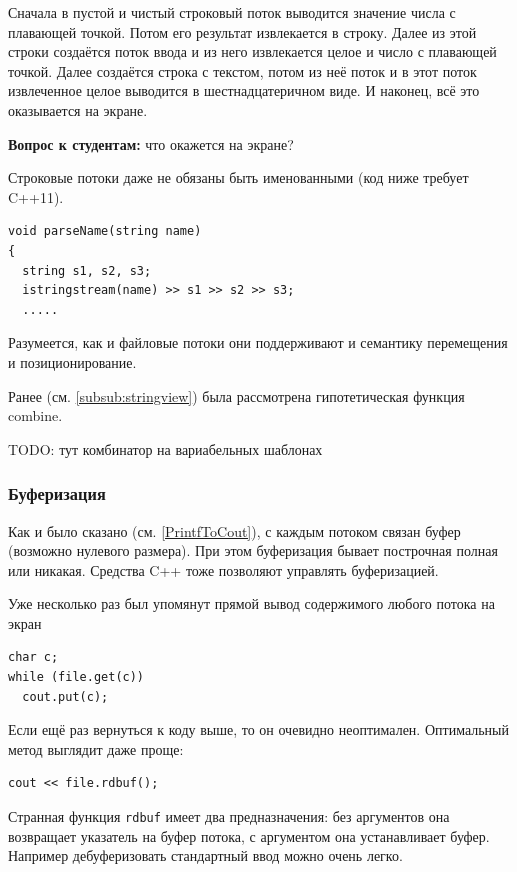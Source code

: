 \documentclass[a4paper,12pt,oneside]{article}
\newif\ifanswers
\begin{document}
Сначала в пустой и чистый строковый поток выводится значение числа с плавающей точкой. Потом его результат извлекается в строку. Далее из этой строки создаётся поток ввода и из него извлекается целое и число с плавающей точкой. Далее создаётся строка с текстом, потом из неё поток и в этот поток извлеченное целое выводится в шестнадцатеричном виде. И наконец, всё это оказывается на экране.

\textbf{Вопрос к студентам:} что окажется на экране?

\ifanswers
Правильный ответ: value: 2a 0.2442
\fi

Строковые потоки даже не обязаны быть именованными (код ниже требует C++11).

\begin{lstlisting}
void parseName(string name)
{
  string s1, s2, s3;
  istringstream(name) >> s1 >> s2 >> s3;
  .....
\end{lstlisting}

Разумеется, как и файловые потоки они поддерживают и семантику перемещения и позиционирование.

Ранее (см. \ref{subsub:stringview}) была рассмотрена гипотетическая функция combine.

TODO: тут комбинатор на вариабельных шаблонах

\subsubsection{Буферизация}

Как и было сказано (см. \ref{PrintfToCout}), с каждым потоком связан буфер (возможно нулевого размера). При этом буферизация бывает построчная полная или никакая. Средства C++ тоже позволяют управлять буферизацией.

Уже несколько раз был упомянут прямой вывод содержимого любого потока на экран

\begin{lstlisting}
char c;
while (file.get(c)) 
  cout.put(c);
\end{lstlisting}

Если ещё раз вернуться к коду выше, то он очевидно неоптимален. Оптимальный метод выглядит даже проще:

\begin{lstlisting}
cout << file.rdbuf();
\end{lstlisting}

Странная функция \lstinline!rdbuf! имеет два предназначения: без аргументов она возвращает указатель на буфер потока, с аргументом она устанавливает буфер. Например дебуферизовать стандартный ввод можно очень легко.
\end{document}
